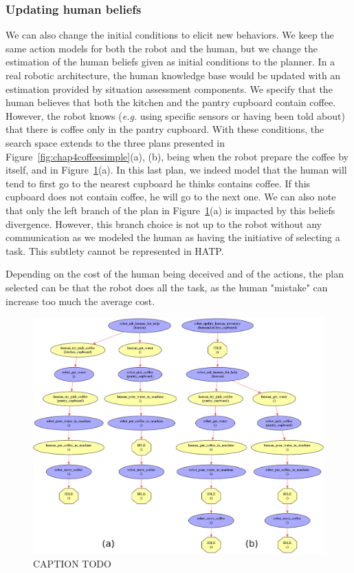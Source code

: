 \documentclass[a4paper,11pt,twoside]{StyleThese}
\begin{document}
\subsubsection{Updating human beliefs}
We can also change the initial conditions to elicit new behaviors. We keep the same action models for both the robot and the human, but we change the estimation of the human beliefs given as initial conditions to the planner. In a real robotic architecture, the human knowledge base would be updated with an estimation provided by situation assessment components. We specify that the human believes that both the kitchen and the pantry cupboard contain coffee. However, the robot knows (\textit{e.g.} using specific sensors or having been told about) that there is coffee only in the pantry cupboard. With these conditions, the search space extends to the three plans presented in Figure~\ref{fig:chap4coffeesimple}(a), (b), being when the robot prepare the coffee by itself, and in Figure~\ref{fig:chap4beliefsdiv}(a). In this last plan, we indeed model that the human will tend to first go to the nearest cupboard he thinks contains coffee. If this cupboard does not contain coffee, he will go to the next one. We can also note that only the left branch of the plan in Figure~\ref{fig:chap4beliefsdiv}(a) is impacted by this beliefs divergence. However, this branch choice is not up to the robot without any communication as we modeled the human as having the initiative of selecting a task. This subtlety cannot be represented in HATP.

Depending on the cost of the human being deceived and of the actions, the plan selected can be that the robot does all the task, as the human "mistake" can increase too much the average cost.

\begin{figure}[hbtp]
\centering
\includegraphics[width=\textwidth]{figures/chapter4/Chap4CoffeeBeliefDiv.png}
\caption{CAPTION TODO}
\label{fig:chap4beliefsdiv}
\end{figure}
\end{document}
